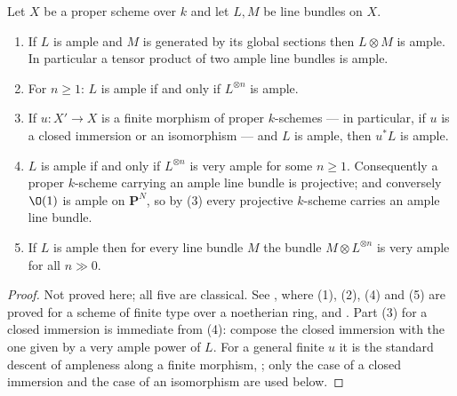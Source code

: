 \begin{lemma}\label{lem:deg-ample-basic}
Let $X$ be a proper scheme over $k$ and let $L,M$ be line bundles on $X$.
\begin{enumerate}
  \item If $L$ is ample and $M$ is generated by its global sections then
  $L\otimes M$ is ample.  In particular a tensor product of two ample line
  bundles is ample.
  \item For $n\geq1$: $L$ is ample if and only if $L^{\otimes n}$ is ample.
  \item If $u\colon X'\to X$ is a finite morphism of proper $k$-schemes ---
  in particular, if $u$ is a closed immersion or an isomorphism --- and $L$ is
  ample, then $u^*L$ is ample.
  \item $L$ is ample if and only if $L^{\otimes n}$ is very ample for some
  $n\geq1$.  Consequently a proper $k$-scheme carrying an ample line bundle is
  projective; and conversely $\O(1)$ is ample on $\mathbf P^N$, so by (3) every
  projective $k$-scheme carries an ample line bundle.
  \item If $L$ is ample then for every line bundle $M$ the bundle
  $M\otimes L^{\otimes n}$ is very ample for all $n\gg0$.
\end{enumerate}
\end{lemma}
\begin{proof}
Not proved here; all five are classical.  See \cite[II, \S7]{Hartshorne}, where
(1), (2), (4) and (5) are proved for a scheme of finite type over a noetherian
ring, and \cite[\S1]{KleimanAmpleness}.  Part (3) for a closed immersion is
immediate from (4): compose the closed immersion with the one given by a very
ample power of $L$.  For a general finite $u$ it is the standard descent of
ampleness along a finite morphism, \cite[III, \S5]{Hartshorne}; only the case
of a closed immersion and the case of an isomorphism are used below.
\end{proof}

